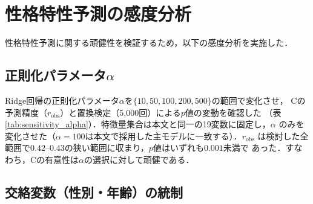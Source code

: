 \documentclass[dvipdfmx,11pt,a4paper]{bxjsarticle}
\renewcommand{\_}{\paperorigunderscore\allowbreak}%
\begin{document}





\section{性格特性予測の感度分析}
\label{sec:appendix_sensitivity}

性格特性予測に関する頑健性を検証するため，以下の感度分析を実施した．

\subsection{正則化パラメータ$\alpha$}
Ridge回帰の正則化パラメータ$\alpha$を$\{10, 50, 100, 200, 500\}$の範囲で変化させ，
Cの予測精度（$r_{\text{obs}}$）と置換検定（5,000回）による$p$値の変動を確認した
（表\ref{tab:sensitivity_alpha}）．特徴量集合は本文と同一の19変数に固定し，$\alpha$
のみを変化させた（$\alpha = 100$は本文で採用した主モデルに一致する）．$r_{\text{obs}}$
は検討した全範囲で$0.42$--$0.43$の狭い範囲に収まり，$p$値はいずれも$0.001$未満で
あった．すなわち，Cの有意性は$\alpha$の選択に対して頑健である．

\begin{table}[htbp]
\centering
\caption{正則化パラメータ$\alpha$に対する感度（Big5次元C，ensemble教師，
5-fold CV，置換検定5,000回）．太字は本文で採用した$\alpha = 100$の行．
$\alpha = 100$の$r_{\text{obs}} = 0.4315$は本文の3桁表記$0.432$に対応する．}
\label{tab:sensitivity_alpha}

\end{table}

\subsection{交絡変数（性別・年齢）の統制}
\label{sec:appendix_confound}
\end{document}
